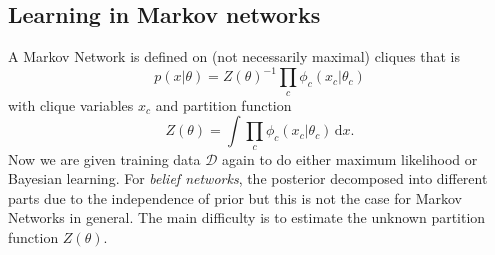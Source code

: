 \subsection{Learning in Markov networks}
A Markov Network is defined on (not necessarily maximal) cliques that is %
\begin{equation}
p(x|\theta) = Z(\theta)^{-1} \prod_c \phi_c(x_c|\theta_c)
\label{eq:Markov_network_likelihood}
\end{equation}
with clique variables \ensuremath{x_c} and partition function %
\begin{equation}
Z(\theta) = \int \prod_c \phi_c (x_c|\theta_c) \, \mathrm{d}x.
\end{equation}%
Now we are given training data \ensuremath{\mathcal{D}} again to do either maximum likelihood or Bayesian learning. %
For \emph{belief networks}, the posterior decomposed into different parts due to the independence of prior but this is not the case for Markov Networks in general. %
The main difficulty is to estimate the unknown partition function \ensuremath{Z(\theta)}. %
\newpage
